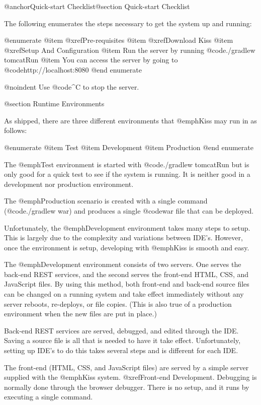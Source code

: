 @anchor{Quick-start Checklist}@section Quick-start Checklist

The following enumerates the steps necessary to get the system up and running:

@enumerate
@item
@xref{Pre-requisites}
@item
@xref{Download Kiss}
@item
@xref{Setup And Configuration}
@item
Run the server by running @code{./gradlew tomcatRun}
@item
You can access the server by going to @code{http://localhost:8080}
@end enumerate

@noindent Use @code{^C} to stop the server.

@section Runtime Environments

As shipped, there are three different environments that @emph{Kiss} may
run in as follows:

@enumerate
@item
Test
@item
Development
@item 
Production
@end enumerate

The @emph{Test} environment is started with @code{./gradlew tomcatRun} but
is only good for a quick test to see if the system is running.  It is
neither good in a development nor production environment.

The @emph{Production} scenario is created with a single command 
(@code{./gradlew war}) and produces a single @code{war} file that
can be deployed.

Unfortunately, the @emph{Development} environment takes many steps to
setup.  This is largely due to the complexity and variations between
IDE's.  However, once the environment is setup, developing with
@emph{Kiss} is smooth and easy.

The @emph{Development} environment consists of two servers.  One serves
the back-end REST services, and the second serves the front-end HTML, CSS, 
and JavaScript files.  By using this method, both front-end and back-end
source files can be changed on a running system and take effect immediately
without any server reboots, re-deploys, or file copies.  (This is also
true of a production environment when the new files are put in place.)

Back-end REST services are served, debugged, and edited through the IDE.
Saving a source file is all that is needed to have it take effect.
Unfortunately, setting up IDE's to do this takes several steps and is different
for each IDE.

The front-end (HTML, CSS, and JavaScript files) are served by a simple
server supplied with the @emph{Kiss} system.  @xref{Front-end Development}.
Debugging is normally done through the browser debugger.
There is no setup, and it runs by executing a single command.

